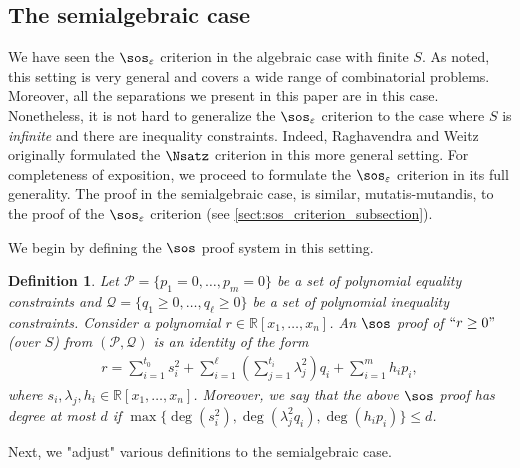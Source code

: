 \documentclass[11pt]{article}
\newtheorem{definition}[theorem]{Definition}
\begin{document}
\subsection{The semialgebraic case}\label{sect:semialgebraic_sos_criterion}

We have seen the $\sos_{\varepsilon}$ criterion in the algebraic case with finite $S$. As noted, this setting is very general and covers a wide range of combinatorial problems. Moreover, all the separations we present in this paper are in this case.
Nonetheless, it is not hard to generalize the $\sos_{\varepsilon}$ criterion to the case where $S$ is \textit{infinite} and there are inequality constraints.
Indeed, Raghavendra and Weitz \cite{raghavendra_weitz2017} originally formulated the $\Nsatz$ criterion in this more general setting. For completeness of exposition, we proceed to formulate the $\sos_{\varepsilon}$ criterion in its full generality. The proof in the semialgebraic case, is similar, mutatis-mutandis, to the proof of the $\sos_{\varepsilon}$ criterion (see \cref{sect:sos_criterion_subsection}).

We begin by defining the $\sos$ proof system in this setting.

\begin{definition}
    Let $\mathcal{P} = \{p_1=0,\ldots,p_m=0\}$ be a set of polynomial equality constraints and $\mathcal{Q} = \{q_1 \geq 0, \ldots, q_\ell \geq 0\}$ be a set of polynomial inequality constraints. Consider a polynomial $r\in \mathbb{R}[x_1, \dots, x_n]$. An $\sos$ proof of $``r\geq 0"$ (over $S$) from $(\mathcal{P}, \mathcal{Q})$ is an identity of the form 
    \begin{align*}
        r = \sum_{i=1}^{t_0} s_i^2 + \sum_{i=1}^\ell \left( \sum_{j=1}^{t_i} \lambda_j^2 \right) q_i + \sum_{i=1}^m h_i p_i,
    \end{align*}
    where $s_i, \lambda_j, h_i\in \mathbb{R}[x_1, \ldots, x_n]$. Moreover, we say that the above $\sos$ proof 
    has \emph{degree} at most $d$ if $\max \{\deg(s_i^2), \deg(\lambda_j^2 q_i), \deg(h_ip_i)\} \leq d$.
\end{definition}

Next, we "adjust" various definitions to the semialgebraic case.
\end{document}
